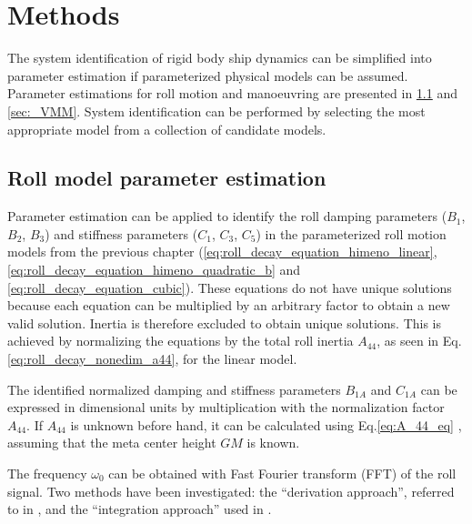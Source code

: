 \chapter{Methods\label{ch:methods}}
The system identification of rigid body ship dynamics can be simplified into parameter estimation if parameterized physical models can be assumed. Parameter estimations for roll motion and manoeuvring are presented in \ref{sec:_roll} and \ref{sec:_VMM}. System identification can be performed by selecting the most appropriate model from a collection of candidate models.

\section{Roll model parameter estimation} \label{sec:_roll}
\noindent Parameter estimation can be applied to identify the roll damping parameters ($B_1$, $B_2$, $B_3$) and stiffness parameters ($C_1$, $C_3$, $C_5$) in the parameterized roll motion models from the previous chapter (\autoref{eq:roll_decay_equation_himeno_linear}, \autoref{eq:roll_decay_equation_himeno_quadratic_b} and \autoref{eq:roll_decay_equation_cubic}). These equations do not have unique solutions because each equation can be multiplied by an arbitrary factor to obtain a new valid solution. Inertia is therefore excluded to obtain unique solutions. This is achieved by normalizing the equations by the total roll inertia $A_{44}$, as seen in Eq.\ref{eq:roll_decay_nonedim_a44}, for the linear model.



\noindent The identified normalized damping and stiffness parameters $B_{1A}$ and $C_{1A}$ can be expressed in dimensional units by multiplication with the normalization factor $A_{44}$. If $A_{44}$ is unknown before hand, it can be calculated using Eq.\ref{eq:A_44_eq} \cite{piehl_ship_2016}, assuming that the meta center height $GM$ is known.


\noindent The frequency $\omega_0$ can be obtained with Fast Fourier transform (FFT) of the roll signal. 
Two methods have been investigated: the ``derivation approach'', referred to in \parencite{imo_1200_2006}, and the ``integration approach'' used in \cite{soder_assessment_2019}. 

